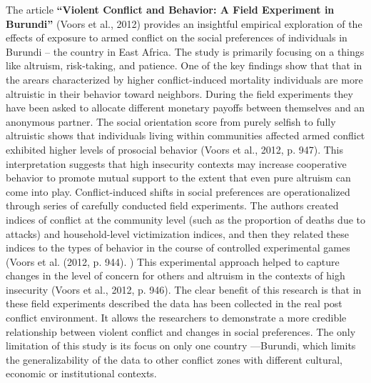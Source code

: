 \documentclass[14pt]{article}
\theoremstyle{remark}
\begin{document}
The article \textbf{``Violent Conflict and Behavior: A Field Experiment in Burundi''} (Voors et al., 2012) provides an insightful empirical exploration of the effects of exposure to armed conflict on the social preferences of individuals in Burundi -- the country in East Africa. The study is primarily focusing on a things like altruism, risk-taking, and patience. One of the key findings show that that in the arears characterized by higher conflict-induced mortality individuals are more altruistic in their behavior toward neighbors. During the field experiments they have been asked to allocate different monetary payoffs between themselves and an anonymous partner. The social orientation score from purely selfish to fully altruistic shows that individuals living within communities affected armed conflict exhibited higher levels of prosocial behavior (Voors et al., 2012, p. 947). This interpretation suggests that high insecurity contexts may increase cooperative behavior to promote mutual support to the extent that even pure altruism can come into play. Conflict-induced shifts in social preferences are operationalized through series of carefully conducted field experiments. The authors created indices of conflict at the community level (such as the proportion of deaths due to attacks) and household-level victimization indices, and then they related these indices to the types of behavior in the course of controlled experimental games (Voors et al. (2012, p. 944). ) This experimental approach helped to capture changes in the level of concern for others and altruism in the contexts of high insecurity (Voors et al., 2012, p. 946). The clear benefit of this research is that in these field experiments described the data has been collected in the real post conflict environment. It allows the researchers to demonstrate a more credible relationship between violent conflict and changes in social preferences. The only limitation of this study is its focus on only one country ---Burundi, which limits the generalizability of the data to other conflict zones with different cultural, economic or institutional contexts.
\end{document}
